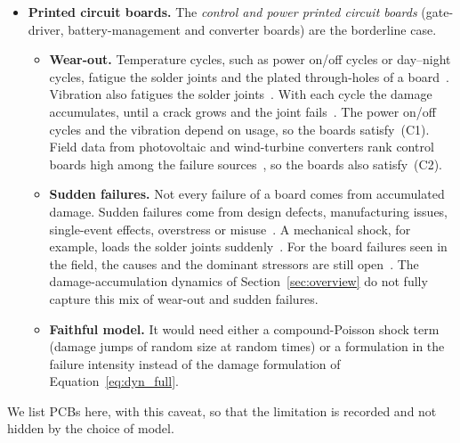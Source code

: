 \documentclass[11pt,a4paper]{article}
\theoremstyle{plain}
\theoremstyle{definition}
\theoremstyle{remark}
\begin{document}
\begin{itemize}
\begin{itemize}
      \item \textbf{Fit to the framework.} Wear-out predictions under changing stress usually add the damage linearly, by the Palmgren--Miner rule~\cite[Sec.~III-D]{WangBlaabjerg2021}.
        The accuracy of this linear rule is still an open question~\cite[Sec.~IV-C]{WangBlaabjerg2021}.
        So capacitor wear-out is a monotone accumulation driven by usage, and it fits the framework.
    \end{itemize}
  \item \textbf{Printed circuit boards.}
    The \emph{control and power printed circuit boards} (gate-driver, battery-management and converter boards) are the borderline case.
    \begin{itemize}
      \item \textbf{Wear-out.} Temperature cycles, such as power on/off cycles or day--night cycles, fatigue the solder joints and the plated through-holes of a board~\cite[Table~1]{Wileman2021}.
        Vibration also fatigues the solder joints~\cite[Table~1]{Wileman2021}.
        With each cycle the damage accumulates, until a crack grows and the joint fails~\cite[Table~1]{Wileman2021}.
        The power on/off cycles and the vibration depend on usage, so the boards satisfy~(C1).
        Field data from photovoltaic and wind-turbine converters rank control boards high among the failure sources~\cite[Sec.~II-A]{WangBlaabjerg2021}, so the boards also satisfy~(C2).
      \item \textbf{Sudden failures.} Not every failure of a board comes from accumulated damage.
        Sudden failures come from design defects, manufacturing issues, single-event effects, overstress or misuse~\cite[Sec.~II]{WangBlaabjerg2021}.
        A mechanical shock, for example, loads the solder joints suddenly~\cite[Table~1]{Wileman2021}.
        For the board failures seen in the field, the causes and the dominant stressors are still open~\cite[Sec.~II-A]{WangBlaabjerg2021}.
        The damage-accumulation dynamics of Section~\ref{sec:overview} do not fully capture this mix of wear-out and sudden failures.
      \item \textbf{Faithful model.} It would need either a compound-Poisson shock term (damage jumps of random size at random times) or a formulation in the failure intensity instead of the damage formulation of Equation~\eqref{eq:dyn_full}.
    \end{itemize}
\end{itemize}
We list PCBs here, with this caveat, so that the limitation is recorded and not hidden by the choice of model.
\end{document}
